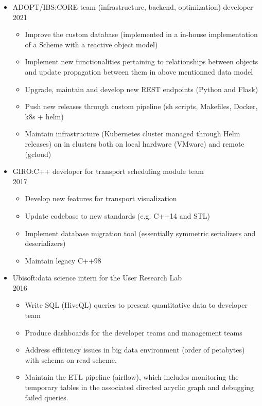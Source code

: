 \documentclass{article}
\begin{document}
\begin{itemize}
  \item ADOPT/IBS:\@ CORE team (infrastructure, backend, optimization) developer\\ 2021
    \begin{itemize}
      \item Improve the custom database 
        (implemented in a in-house implementation of a Scheme with a reactive object model)
      \item Implement new functionalities pertaining to relationships between objects
        and update propagation between them in above mentionned data model
      \item Upgrade, maintain and develop new REST endpoints (Python and Flask)
      \item Push new releases through custom pipeline 
        (sh scripts, Makefiles, Docker, k8s + helm)
      \item Maintain infrastructure (Kubernetes cluster managed through Helm releases)
        on in clusters both on local hardware (VMware) and remote (gcloud)
    \end{itemize}

  \item GIRO:\@ C++ developer for transport scheduling module team \\ 2017
    \begin{itemize}
      \item Develop new features for transport visualization
      \item Update codebase to new standards (e.g. C++14 and STL)
      \item Implement database migration tool (essentially symmetric serializers and deserializers)
      \item Maintain legacy C++98
    \end{itemize}

\clearpage

  \item Ubisoft:\@ data science intern for the User Research Lab\\ 2016
    \begin{itemize}
      \item Write SQL (HiveQL) queries to present quantitative data to developer team
      \item Produce dashboards for the developer teams and management teams
      \item Address efficiency issues in big data environment (order of petabytes)
        with schema on read scheme.
      \item Maintain the ETL pipeline (airflow), which includes monitoring
        the temporary tables in the associated directed acyclic graph and debugging failed queries.
    \end{itemize}


\end{itemize}
\end{document}
